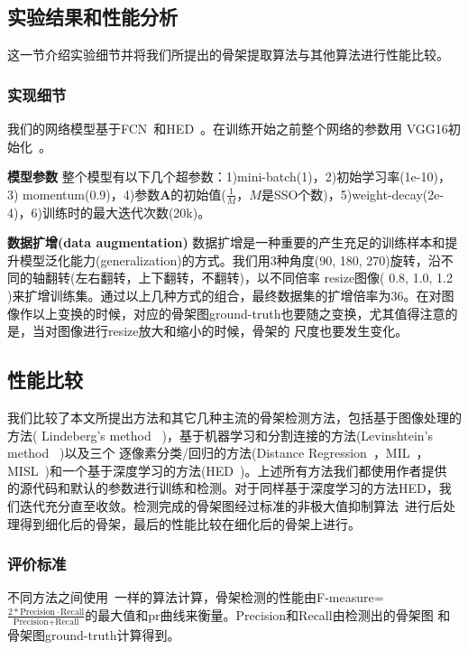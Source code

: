 \documentclass[UTF8]{ctexart}
\numberwithin{equation}{section} %
\numberwithin{table}{section} %
\begin{document}
\subsection{实验结果和性能分析}
这一节介绍实验细节并将我们所提出的骨架提取算法与其他算法进行性能比较。
\subsubsection{实现细节}
我们的网络模型基于FCN~\cite{long2015fully}和HED~\cite{xie2015holistically}。在训练开始之前整个网络的参数用 VGG16初始化~\cite{Simonyan14c}。

\vspace{1em}
\noindent \textbf{模型参数} 整个模型有以下几个超参数：1)mini-batch(1)，2)初始学习率(1e-10)，3) momentum(0.9)，4)参数$\mathbf{A}$的初始值($\frac{1}{M}$，$M$是SSO个数)，5)weight-decay(2e-4)，6)训练时的最大迭代次数(20k)。

\vspace{1em}
\noindent \textbf{数据扩增(data augmentation)} 数据扩增是一种重要的产生充足的训练样本和提升模型泛化能力(generalization)的方式。我们用3种角度(90, 180, 270)旋转，沿不同的轴翻转(左右翻转，上下翻转，不翻转)，以不同倍率
resize图像( 0.8, 1.0, 1.2 )来扩增训练集。通过以上几种方式的组合，最终数据集的扩增倍率为36。在对图像作以上变换的时候，对应的骨架图ground-truth也要随之变换，尤其值得注意的是，当对图像进行resize放大和缩小的时候，骨架的
尺度也要发生变化。

\subsection{性能比较}
我们比较了本文所提出方法和其它几种主流的骨架检测方法，包括基于图像处理的方法( Lindeberg's method ~\cite{lindeberg1998edge})，基于机器学习和分割连接的方法(Levinshtein's method ~\cite{levinshtein2013multiscale})以及三个
逐像素分类/回归的方法(Distance Regression~\cite{sironi2014multiscale}，MIL~\cite{tsogkas2012learning}，MISL~\cite{shen2013skeleton})和一个基于深度学习的方法(HED~\cite{xie2015holistically})。上述所有方法我们都使用作者提供
的源代码和默认的参数进行训练和检测。对于同样基于深度学习的方法HED，我们迭代充分直至收敛。检测完成的骨架图经过标准的非极大值抑制算法~\cite{dollar2015fast}进行后处理得到细化后的骨架，最后的性能比较在细化后的骨架上进行。

\subsubsection{评价标准}
不同方法之间使用~\cite{tsogkas2012learning}一样的算法计算，骨架检测的性能由F-measure=\\$\frac{2*\text{Precision}\cdot\text{Recall}}{\text{Precision}+\text{Recall}}$的最大值和pr曲线来衡量。Precision和Recall由检测出的骨架图
和骨架图ground-truth计算得到。
\end{document}
